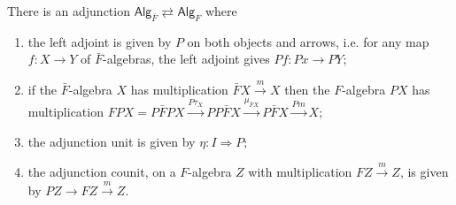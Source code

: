 \documentclass[a4paper,10pt
]{article}%
\renewcommand{\1}{\eta}%
\begin{document}
\begin{proposition}
There is an adjunction
$\mathsf{Alg}_{\bar{F}} \rightleftarrows \mathsf{Alg}_{F}$
where
\begin{enumerate}[label=(\roman*)]
\item the left adjoint is given by $P$ on both objects and arrows, 
i.e. for any map $f \colon X \to Y$ of $\bar{F}$-algebras, the left adjoint gives
$Pf \colon Px \to PY$;
\item if the $\bar{F}$-algebra $X$ has multiplication
$\bar{F}X \xrightarrow{m} X$
then the $F$-algebra $PX$ has multiplication
$FPX = P\bar{F}P X \xrightarrow{P\tau_X}
PP\bar{F}X \xrightarrow{\mu_{\bar{F}X}} P\bar{F} X
\xrightarrow{Pm} X$;
\item the adjunction unit is given by $\eta \colon I \Rightarrow P$;
\item the adjunction counit, on a $F$-algebra $Z$ with multiplication
$FZ \xrightarrow{m} Z$,
is given by
$PZ \rightarrow FZ \xrightarrow{m}Z$.
\end{enumerate}
\end{proposition}
\end{document}
